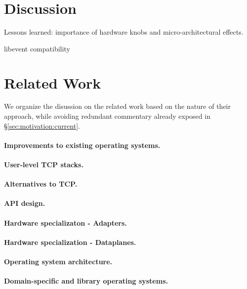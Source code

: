 

\section{Discussion}

\todo Lessons learned: importance of hardware knobs and micro-architectural effects.

\todo libevent compatibility


\section{Related Work}

We organize the disussion on the related work based on the nature of their approach, while avoiding redundant commentary already exposed in \S\ref{sec:motivation:current}.

\paragraph{Improvements to existing operating systems.}

\paragraph{User-level TCP stacks.}

\paragraph{Alternatives to TCP.}

\paragraph{API design.}

\paragraph{Hardware specializaton - Adapters.}

\paragraph{Hardware specialization - Dataplanes.}

\paragraph{Operating system architecture.}

\paragraph{Domain-specific and library operating systems.}
